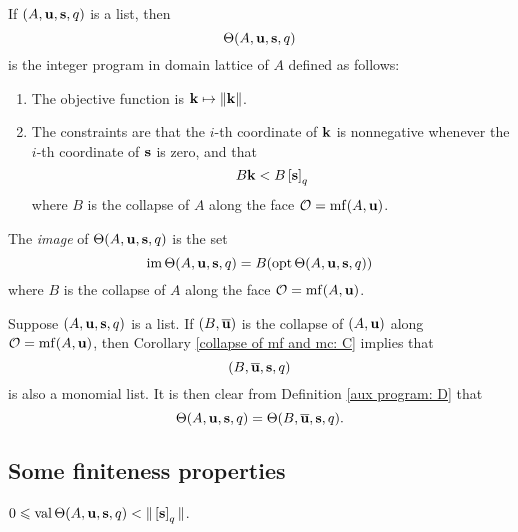 \documentclass[11pt]{amsart}
\renewcommand{\!}[1]{{\color{red}\text{$\star$\,}#1\,$\star$}}
\newcommand{\ol}[1]{\overline{#1}}
\begin{document}
\begin{definition}  
\label{aux program: D}
If $(A, \mathbf{u}, \mathbf{s}, q)$ is a list, then
\[ \Theta(A, \mathbf{u}, \mathbf{s}, q) \] 
is the integer program in domain lattice of $A$ defined as follows:
\begin{enumerate}
\item The objective function is $\mathbf{k} \mapsto \| \mathbf{k} \|$.
\item The constraints are that the $i$-th coordinate of $\mathbf{k}$ is nonnegative whenever the $i$-th coordinate of $\mathbf{s}$ is zero, and that \[ B \mathbf{k}  < B \left[ \mathbf{s} \right]_q\]
where $B$ is the collapse of $A$ along the face $\mathcal{O} = \operatorname{mf}(A, \mathbf{u})$.
\end{enumerate}
\end{definition}

\begin{definition}
The \emph{image} of $\Theta(A, \mathbf{u}, \mathbf{s}, q)$ is the set \[ \operatorname{im} \Theta(A, \mathbf{u}, \mathbf{s}, q)  = B (\operatorname{opt} \Theta(A, \mathbf{u}, \mathbf{s}, q))\] 
where $B$ is the collapse of $A$ along the face $\mathcal{O} = \operatorname{mf}(A, \mathbf{u})$.
\end{definition}

\begin{remark}
\label{collapsed aux program: R}
Suppose $(A, \mathbf{u}, \mathbf{s}, q)$ is a list.  If $(B, \ol{\vv{u}})$ is the collapse of $(A ,\mathbf{u})$ along $\mathcal{O} = \operatorname{mf}(A, \mathbf{u})$, then Corollary \ref{collapse of mf and mc: C} implies that 
\[ (B, \ol{\vv{u}}, \vv{s}, q) \] is also a monomial list.  It is then clear from Definition \ref{aux program: D} that 
\[ \ip(A, \vv{u}, \vv{s}, q) = \ip(B, \ol{\vv{u}}, \vv{s}, q). \] 
\end{remark}

\subsection{Some finiteness properties}  

\begin{lemma}
\label{bounded value: L} 
$0 \leqslant  \operatorname{val}  \Theta(A, \mathbf{u}, \mathbf{s}, q) < \| \left[ \mathbf{s} \right]_q \|$.  
\end{lemma}
\end{document}
